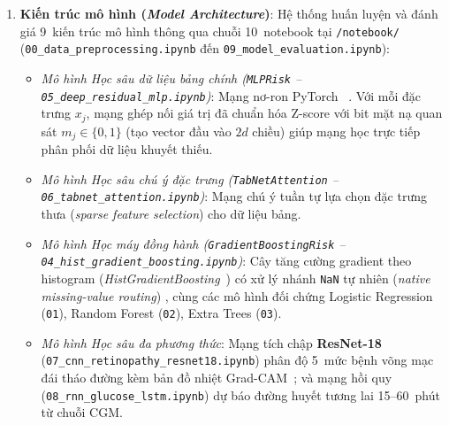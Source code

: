 \begin{enumerate}
  \item \textbf{Kiến trúc mô hình (\emph{Model Architecture})}:
  Hệ thống huấn luyện và đánh giá 9~kiến trúc mô hình thông qua chuỗi 10~notebook tại \texttt{/notebook/} (\texttt{00\_data\_preprocessing.ipynb} đến \texttt{09\_model\_evaluation.ipynb}):
  \begin{itemize}
    \item \emph{Mô hình Học sâu dữ liệu bảng chính (\texttt{MLPRisk} -- \texttt{05\_deep\_residual\_mlp.ipynb})}: Mạng nơ-ron PyTorch~\cite{paszke2019} . Với mỗi đặc trưng $x_j$, mạng ghép nối giá trị đã chuẩn hóa Z-score với bit mặt nạ quan sát $m_j \in \{0,1\}$ (tạo vector đầu vào $2d$ chiều) giúp mạng học trực tiếp phân phối dữ liệu khuyết thiếu.
    \item \emph{Mô hình Học sâu chú ý đặc trưng (\texttt{TabNetAttention} -- \texttt{06\_tabnet\_attention.ipynb})}: Mạng chú ý tuần tự lựa chọn đặc trưng thưa (\emph{sparse feature selection}) cho dữ liệu bảng.
    \item \emph{Mô hình Học máy đồng hành (\texttt{GradientBoostingRisk} -- \texttt{04\_hist\_gradient\_boosting.ipynb})}: Cây tăng cường gradient theo histogram (\emph{HistGradientBoosting}~\cite{friedman2001,ke2017}) có xử lý nhánh \texttt{NaN} tự nhiên (\emph{native missing-value routing}) , cùng các mô hình đối chứng Logistic Regression (\texttt{01}), Random Forest (\texttt{02}), Extra Trees (\texttt{03}).
    \item \emph{Mô hình Học sâu đa phương thức}: Mạng tích chập \textbf{ResNet-18}~\cite{he2016} (\texttt{07\_cnn\_retinopathy\_resnet18.ipynb}) phân độ 5~mức bệnh võng mạc đái tháo đường kèm bản đồ nhiệt Grad-CAM~\cite{selvaraju2017}; và mạng hồi quy ~\cite{hochreiter1997} (\texttt{08\_rnn\_glucose\_lstm.ipynb}) dự báo đường huyết tương lai 15--60~phút từ chuỗi CGM.
  \end{itemize}


\end{enumerate}
